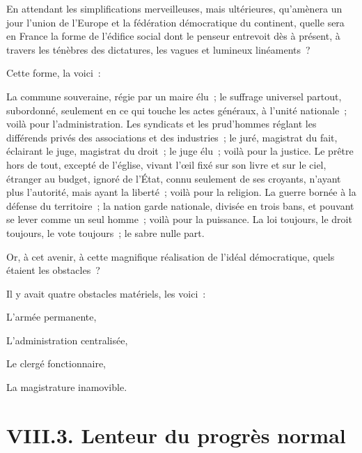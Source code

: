 \documentclass[french,twoside]{book} %
\begin{document}
\noindent En attendant les simplifications merveilleuses, mais ultérieures, qu’amènera un jour l’union de l’Europe et la fédération démocratique du continent, quelle sera en France la forme de l’édifice social dont le penseur entrevoit dès à présent, à travers les ténèbres des dictatures, les vagues et lumineux linéaments ?\par
Cette forme, la voici :\par
La commune souveraine, régie par un maire élu ; le suffrage universel partout, subordonné, seulement en ce qui touche les actes généraux, à l’unité nationale ; voilà pour l’administration. Les syndicats et les prud’hommes réglant les différends privés des associations et des industries ; le juré, magistrat du fait, éclairant le juge, magistrat du droit ; le juge élu ; voilà pour la justice. Le prêtre hors de tout, excepté de l’église, vivant l’œil fixé sur son livre et sur le ciel, étranger au budget, ignoré de l’État, connu seulement de ses croyants, n’ayant plus l’autorité, mais ayant la liberté ; voilà pour la religion. La guerre bornée à la défense du territoire ; la nation garde nationale, divisée en trois bans, et pouvant se lever comme un seul homme ; voilà pour la puissance. La loi toujours, le droit toujours, le vote toujours ; le sabre nulle part.\par
Or, à cet avenir, à cette magnifique réalisation de l’idéal démocratique, quels étaient les obstacles ?\par
Il y avait quatre obstacles matériels, les voici :\par
L’armée permanente,\par
L’administration centralisée,\par
Le clergé fonctionnaire,\par
La magistrature inamovible.

\section[{VIII.3. Lenteur du progrès normal}]{VIII.3. Lenteur du progrès normal}
\end{document}
